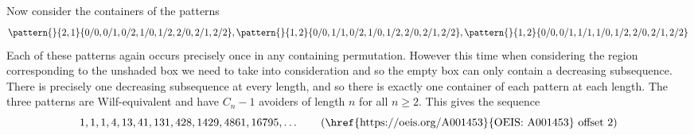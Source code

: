 \subsection{}
Now consider the containers of the patterns
\begin{equation*}
    \pattern{}{2,1}{0/0,0/1,0/2,1/0,1/2,2/0,2/1,2/2},
    \pattern{}{1,2}{0/0,1/1,0/2,1/0,1/2,2/0,2/1,2/2},
    \pattern{}{1,2}{0/0,0/1,1/1,1/0,1/2,2/0,2/1,2/2}
\end{equation*}
Each of these patterns again occurs precisely once in
any containing permutation. However this time when considering
the region corresponding to the unshaded box we need to take into consideration
and so the empty box can only contain a decreasing subsequence. There
is precisely one decreasing subsequence at every length, and so there
is exactly one container of each pattern at each length. The three
patterns are Wilf-equivalent and have \(C_n - 1\) avoiders of
length \(n\) for all \(n \ge 2\).
This gives the sequence
\begin{equation*}
    1, 1, 1, 4, 13, 41, 131, 428, 1429, 4861, 16795,\dotsc\tag{\href{https://oeis.org/A001453}{OEIS: A001453} offset 2}
\end{equation*}

